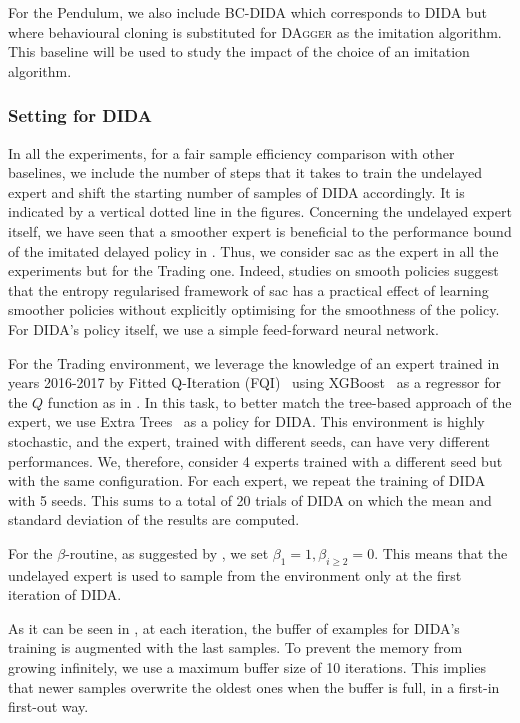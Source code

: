 For the Pendulum, we also include BC-DIDA which corresponds to DIDA but where behavioural cloning \cite{bain1995framework} is substituted for \textsc{DAgger} as the imitation algorithm. 
This baseline will be used to study the impact of the choice of an imitation algorithm.


\subsubsection{Setting for DIDA}
\label{subsubsection:our_approach_dida}
In all the experiments, for a fair sample efficiency comparison with other baselines, we include the number of steps that it takes to train the undelayed expert and shift the starting number of samples of DIDA accordingly. 
It is indicated by a vertical dotted line in the figures.
Concerning the undelayed expert itself, we have seen that a smoother expert is beneficial to the performance bound of the imitated delayed policy in . 
Thus, we consider \gls{sac} as the expert in all the experiments but for the Trading one.  
Indeed, studies on smooth policies \cite{mysore2021regularizing} suggest that the entropy regularised framework of \gls{sac} has a practical effect of learning smoother policies without explicitly optimising for the smoothness of the policy.
For DIDA's policy itself,  we use a simple feed-forward neural network.

For the Trading environment, we leverage the knowledge of an expert trained in years 2016-2017 by Fitted Q-Iteration (FQI)~\cite{ernst2005tree} using XGBoost~\cite{chen2016xgboost} as a regressor for the $Q$ function as in \cite{riva2022addressing}.
In this task, to better match the tree-based approach of the expert, we use Extra Trees~\cite{geurts2006extremely} as a policy for DIDA.
This environment is highly stochastic, and the expert, trained with different seeds, can have very different performances. 
We, therefore, consider 4 experts trained with a different seed but with the same configuration. 
For each expert, we repeat the training of DIDA with 5 seeds.
This sums to a total of 20 trials of DIDA on which the mean and standard deviation of the results are computed. 


For the $\beta$-routine, as suggested by \cite{ross2011reduction}, we set $\beta_1=1, \beta_{i\ge 2}=0$. 
This means that the undelayed expert is used to sample from the environment only at the first iteration of DIDA.


As it can be seen in , at each iteration, the buffer of examples for DIDA's training is augmented with the last samples. To prevent the memory from growing infinitely, we use a maximum buffer size of 10 iterations. 
This implies that newer samples overwrite the oldest ones when the buffer is full, in a first-in first-out way.



